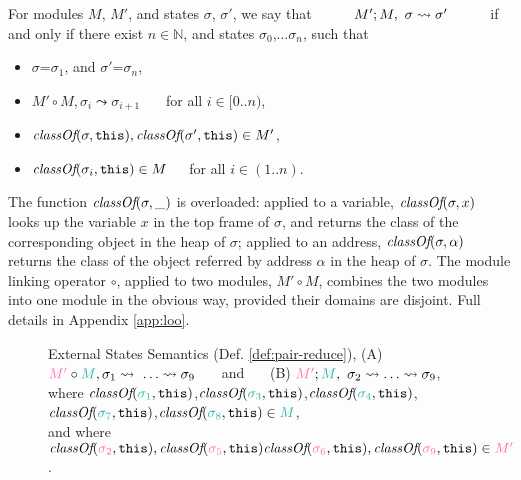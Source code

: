 \begin{definition}
\label{def:pair-reduce}
For  
  modules $M$,  $M'$, and %
   states $\sigma$, $\sigma'$, 
we say that $\ \ \ \ \ \ \ \ \reduction{M'}{M}{\sigma}{\sigma'}\ \ \ \ \ \ \ \ $ if and only if there exist 
$n\in\mathbb{N}$, and states $\sigma_0$,...$\sigma_n$, such that
\begin{itemize}
\item
$\sigma$=$\sigma_1$, and  $\sigma'$=$\sigma_n$,
\item
$M' \circ M, \sigma_i \leadsto \sigma_{i+1}$  \ \ \ for all $i\in [0..n)$,
\item
$\textit{classOf}(\sigma, {{\texttt{this}}}), \textit{classOf}(\sigma', {{\texttt{this}}})\in M'$,
\item
$\textit{classOf}(\sigma_i, {{\texttt{this}}}) \in M$\ \ \ for all $i\in (1..n)$.
\end{itemize} 
\end{definition}
The function $\textit{classOf}(\sigma, \_)$ is overloaded:
  applied to a variable, 
$\textit{classOf}(\sigma, x)$  looks up the variable $x$ in the top frame of $\sigma$, and returns the 
class of the corresponding object in the  heap of $\sigma$;
applied to an address, $\textit{classOf}(\sigma, \alpha)$  returns
the class of   the object referred by address $\alpha$ in the heap of $\sigma$.
 The module linking operator $\circ$, applied to two modules, $M'\circ M$, 
 combines the two modules into one module in the obvious way, provided their
domains are disjoint.
Full details in  Appendix \ref{app:loo}.
\begin{figure}[htb]

   \caption{External States Semantics
     (Def. \ref{def:pair-reduce}),  %
     (A) $\exec{{\color{hotpink}M'} \circ {\color{lightseagreen}M}}{\sigma_1}{\ldots}\leadsto \sigma_9$ \ \ \ and \ \ \ 
     (B) $\reduction{{\color{hotpink}M'}}{{\color{lightseagreen}M}}{\sigma_2}{\ldots}\leadsto \sigma_9$, \ \ \ 
     \\
     where $\class{{\color{lightseagreen}\sigma_1}}{\scd{\prg{this}}}$,$\class{{\color{lightseagreen}\sigma_3}}{\scd{\prg{this}}}$,$\class{{\color{lightseagreen}\sigma_4}}{\scd{\prg{this}}}$,$\class{{\color{lightseagreen}\sigma_7}}{\scd{\prg{this}}}$,$\class{{\color{lightseagreen}\sigma_8}}{\scd{\prg{this}}}\in {\color{lightseagreen}M}$,\\
     and where $\class{{\color{hotpink}\sigma_2}}{\scd{\prg{this}}},\class{{\color{hotpink}\sigma_5}}{\scd{\prg{this}}} 
     \class{{\color{hotpink}\sigma_6}}{\scd{\prg{this}}},\class{{\color{hotpink}\sigma_9}}{\scd{\prg{this}}}\in {\color{hotpink}M'}$.
    }
   \label{fig:VisibleStates}
 \end{figure}
 
